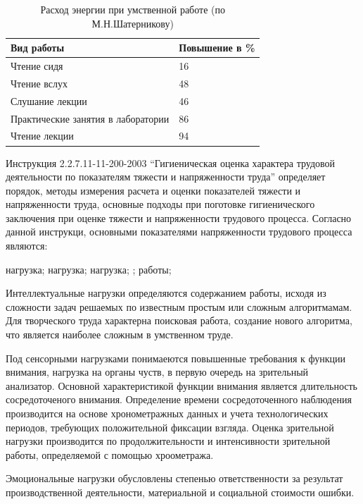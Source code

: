 \documentclass[14pt,a4paper]{reportmod}
\begin{document}
\begin{table}
  \centering
  \caption{Расход энергии при умственной работе (по М.Н.Шатерникову)}
  \label{tabl:ohrana1}
  \begin{tabular}{|m{10cm}|m{4cm}|}
    \hline
    \bfseries{Вид работы} &
    \bfseries{Повышение в \%} \\
    \hline
    Чтение сидя & 16\\
    \hline
    Чтение вслух & 48\\
    \hline
    Слушание лекции & 46\\
    \hline
    Практические занятия в лаборатории & 86\\
    \hline
    Чтение лекции & 94\\
    \hline
  \end{tabular}
\end{table}


Инструкция 2.2.7.11-11-200-2003 ``Гигиеническая оценка характера трудовой деятельности по показателям тяжести и напряженности труда'' определяет порядок, методы измерения расчета и оценки показателей тяжести и напряженности труда, основные подходы при поготовке гигиенического заключения при оценке тяжести и напряженности трудового процесса. Согласно данной инструкци, основными показателями напряженности трудового процесса являются:
\begin{itemize}
   нагрузка;
   нагрузка;
   нагрузка;
  ;
   работы;
\end{itemize}
Интеллектуальные нагрузки определяются содержанием работы, исходя из сложности задач решаемых по известным простым или сложным алгоритмамам. Для творческого труда характерна поисковая работа, создание нового алгоритма, что является наиболее сложным в умственном труде.


Под сенсорными нагрузками понимаеются повышенные требования к функции внимания, нагрузка на органы чуств, в первую очередь на зрительный анализатор. Основной характеристикой функции внимания является длительность сосредоточеного внимания. Определение времени сосредоточенного наблюдения производится на основе хронометражных данных и учета технологических периодов, требующих положительной фиксации взгляда. Оценка зрительной нагрузки производится по продолжительности и интенсивности зрительной работы, определяемой с помощью хроометража.


Эмоциональные нагрузки обусловлены степенью ответственности за результат производственной деятельности, материальной и социальной стоимости ошибки.
\end{document}
